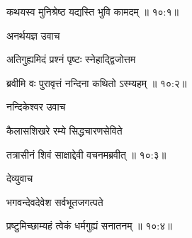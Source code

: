 
{\devanagarifont कथयस्व मुनिश्रेष्ठ यद्यस्ति भुवि कामदम् {॥ १०:\hspace{.11em}१॥} \veg\dontdisplaylinenum }%

{\devanagarifont अनर्थयज्ञ उवाच {\dandab}\dontdisplaylinenum  }%
 
{\devanagarifont अतिगुह्यमिदं प्रश्नं पृष्टः स्नेहाद्द्विजोत्तम \thinspace{\danda} \dontdisplaylinenum }%


{\devanagarifont ब्रवीमि वः पुरावृत्तं नन्दिना कथितो ऽस्म्यहम् {॥ १०:\hspace{.11em}२॥} \veg\dontdisplaylinenum }%

{\devanagarifont नन्दिकेश्वर उवाच {\dandab}\dontdisplaylinenum  }%

{\devanagarifont कैलासशिखरे रम्ये सिद्धचारणसेविते \thinspace{\danda} \dontdisplaylinenum }%


{\devanagarifont तत्रासीनं शिवं साक्षाद्देवी वचनमब्रवीत् {॥ १०:\hspace{.11em}३॥} \veg\dontdisplaylinenum }%
 
{\devanagarifont देव्युवाच {\dandab}\dontdisplaylinenum  }%
 
{\devanagarifont भगवन्देवदेवेश सर्वभूतजगत्पते \thinspace{\danda} \dontdisplaylinenum }%


{\devanagarifont प्रष्टुमिच्छाम्यहं त्वेकं धर्मगुह्यं सनातनम् {॥ १०:\hspace{.11em}४॥} \veg\dontdisplaylinenum }%

